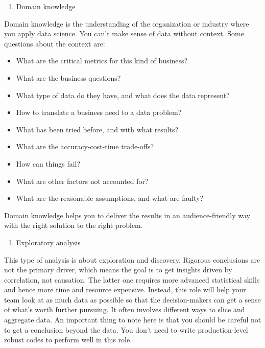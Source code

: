 \documentclass[
  12pt,
]{krantz}
\providecommand{\tightlist}{%
  \setlength{\itemsep}{0pt}\setlength{\parskip}{0pt}}
\begin{document}
\begin{enumerate}
\def\labelenumi{(\arabic{enumi})}
\tightlist
\item
  Domain knowledge
\end{enumerate}

Domain knowledge is the understanding of the organization or industry where you apply data science. You can't make sense of data without context. Some questions about the context are:

\begin{itemize}
\tightlist
\item
  What are the critical metrics for this kind of business?
\item
  What are the business questions?
\item
  What type of data do they have, and what does the data represent?
\item
  How to translate a business need to a data problem?
\item
  What has been tried before, and with what results?
\item
  What are the accuracy-cost-time trade-offs?
\item
  How can things fail?
\item
  What are other factors not accounted for?
\item
  What are the reasonable assumptions, and what are faulty?
\end{itemize}

Domain knowledge helps you to deliver the results in an audience-friendly way with the right solution to the right problem.

\begin{enumerate}
\def\labelenumi{(\arabic{enumi})}
\setcounter{enumi}{1}
\tightlist
\item
  Exploratory analysis
\end{enumerate}

This type of analysis is about exploration and discovery. Rigorous conclusions are not the primary driver, which means the goal is to get insights driven by correlation, not causation. The latter one requires more advanced statistical skills and hence more time and resource expensive. Instead, this role will help your team look at as much data as possible so that the decision-makers can get a sense of what's worth further pursuing. It often involves different ways to slice and aggregate data. An important thing to note here is that you should be careful not to get a conclusion beyond the data. You don't need to write production-level robust codes to perform well in this role.
\end{document}
